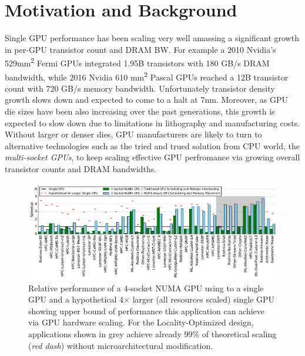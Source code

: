 \section{Motivation and Background}
\label{background}

Single GPU performance has been scaling very well amassing a significant
growth in per-GPU transistor count and DRAM BW. For example a 2010 Nvidia's
529mm\textsuperscript{2} Fermi GPUs integrated 1.95B transistors with 180 GB/s
DRAM bandwidth, while 2016 Nvidia 610 mm\textsuperscript{2} Pascal GPUs reached
a 12B transistor count with 720 GB/s memory bandwidth. Unfortunately transistor density
growth slows down and expected to come to a halt at 7nm. Moreover, as GPU die sizes
have been also increasing over the past generations, this growth is expected to
slow down due to limitations in lithography and manufacturing costs. 
Without larger or denser dies, GPU manufacturers are likely to turn to 
alternative technologies such as the tried and trued solution from CPU world,
the \textit{multi-socket GPUs}, to keep scaling effective GPU perfromance via 
growing overall transistor counts and DRAM bandwidths. 


\begin{figure}[tp] 
    \centering
    \includegraphics[width=1.0\linewidth]{figures/plot_different_baselines.pdf}
    \caption{Relative performance of a 4-socket NUMA GPU using to a single GPU 
and a hypothetical 4$\times$ larger (all resources scaled) single GPU showing 
upper bound of performance this application can achieve via GPU hardware 
scaling. For the Locality-Optimized design, applications shown in grey 
achieve already 99\% of theoretical scaling (\emph{red dash}) without 
microarchitectural modification.}
    \label{fig:motivation}
\end{figure}

